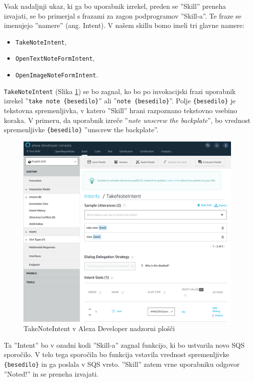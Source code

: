 \documentclass[a4paper, 12pt]{book}
\begin{document}
Vsak nadaljnji ukaz, ki ga bo uporabnik izrekel, preden se ''Skill'' preneha izvajati, se bo primerjal s frazami za zagon podprogramov ''Skill-a''.
Te fraze se imenujejo ''namere'' (ang. Intent).
V našem skillu bomo imeli tri glavne namere:

\begin{itemize}
	\item \texttt{TakeNoteIntent},
	\item \texttt{OpenTextNoteFormIntent},
	\item \texttt{OpenImageNoteFormIntent}.
\end{itemize}

\texttt{TakeNoteIntent} (Slika \ref{TakeNoteIntent}) se bo zagnal, ko bo po invokacijski frazi uporabnik izrekel ''\texttt{take note \{besedilo\}}'' ali ''\texttt{note \{besedilo\}}''.
Polje \texttt{\{besedilo\}} je tekstovna spremenljivka, v katero ''Skill'' hrani razpoznano tekstovno vsebino koraka.
V primeru, da uporabnik izreče ''\textit{note unscrew the backplate}'', bo vrednost spremenljivke \texttt{\{besedilo\}} ''unscrew the backplate''.

\begin{figure}[H]
\begin{center}
\includegraphics[width=13cm]{intent_literal}
\end{center}
\caption{TakeNoteIntent v Alexa Developer nadzorni plošči}
\label{TakeNoteIntent}
\end{figure}

Ta ''Intent'' bo v ozadni kodi ''Skill-a'' zagnal funkcijo, ki bo ustvarila novo SQS sporočilo.
V telo tega sporočila bo funkcija vstavila vrednost spremenljivke \texttt{\{besedilo\}} in ga poslala v SQS vrsto.
''Skill'' zatem vrne uporabniku odgovor ''Noted!'' in se preneha izvajati.
\end{document}
